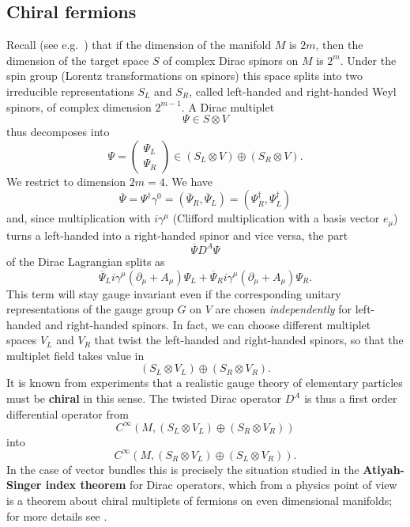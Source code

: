 \documentclass[12pt]{amsart}
\theoremstyle{definition}
\theoremstyle{remark}
\numberwithin{equation}{section}
\begin{document}
\subsection{Chiral fermions}
Recall (see e.g.~\cite{Morgan}) that if the dimension of the manifold $M$ is $2m$, then the dimension of the target space $S$ of complex Dirac spinors on $M$ is $2^m$. Under the spin group (Lorentz transformations on spinors) this space splits into two irreducible representations $S_L$ and $S_R$, called left-handed and right-handed Weyl spinors, of complex dimension $2^{m-1}$. A Dirac multiplet
\begin{equation*}
\Psi\in S\otimes V
\end{equation*}
thus decomposes into
\begin{equation*}
\Psi=\left(\begin{array}{c}\Psi_L \\ \Psi_R  \end{array}\right)\in (S_L\otimes V)\oplus (S_R\otimes V).
\end{equation*}
We restrict to dimension $2m=4$. We have 
\begin{equation*}
\overline{\Psi}=\Psi^\dagger\gamma^0=\left(\overline{\Psi}_R,\overline{\Psi}_L\right)=\left(\Psi^\dagger_R,\Psi^\dagger_L\right)
\end{equation*}
and, since multiplication with $i\gamma^\mu$ (Clifford multiplication with a basis vector $e_\mu$) turns a left-handed into a right-handed spinor and vice versa, the part
\begin{equation*}
\overline{\Psi}D^A\Psi
\end{equation*}
of the Dirac Lagrangian splits as
\begin{equation*}
\overline{\Psi}_Li\gamma^\mu(\partial_\mu+A_\mu)\Psi_L+\overline{\Psi}_Ri\gamma^\mu(\partial_\mu+A_\mu)\Psi_R.
\end{equation*}
This term will stay gauge invariant even if the corresponding unitary representations of the gauge group $G$ on $V$ are chosen {\em independently} for left-handed and right-handed spinors. In fact, we can choose different multiplet spaces $V_L$ and $V_R$ that twist the left-handed and right-handed spinors, so that the multiplet field takes value in
\begin{equation*}
(S_L\otimes V_L)\oplus (S_R\otimes V_R).
\end{equation*}
It is known from experiments that a realistic gauge theory of elementary particles must be {\bf chiral} in this sense. The twisted Dirac operator $D^A$ is thus a first order differential operator from
\begin{equation*}
C^\infty(M,(S_L\otimes V_L)\oplus (S_R\otimes V_R))
\end{equation*}
into
\begin{equation*}
C^\infty(M,(S_R\otimes V_L)\oplus (S_L\otimes V_R)).
\end{equation*}
In the case of vector bundles this is precisely the situation studied in the {\bf Atiyah-Singer index theorem} for Dirac operators, which from a physics point of view is a theorem about chiral multiplets of fermions on even dimensional manifolds; for more details see \cite{Berline}. 
\end{document}
